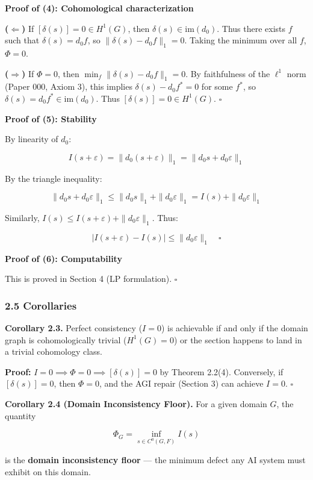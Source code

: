 \documentclass[
]{article}
\begin{document}
\textbf{Proof of (4): Cohomological characterization}

\textbf{(\(\Longleftarrow\))} If \([\delta(s)] = 0 \in H^1(G)\), then
\(\delta(s) \in \text{im}(d_0)\). Thus there exists \(f\) such that
\(\delta(s) = d_0 f\), so \(\|\delta(s) - d_0 f\|_1 = 0\). Taking the
minimum over all \(f\), \(\Phi = 0\).

\textbf{(\(\Longrightarrow\))} If \(\Phi = 0\), then
\(\min_f \|\delta(s) - d_0 f\|_1 = 0\). By faithfulness of the
\(\ell^1\) norm (Paper 000, Axiom 3), this implies
\(\delta(s) - d_0 f^* = 0\) for some \(f^*\), so
\(\delta(s) = d_0 f^* \in \text{im}(d_0)\). Thus
\([\delta(s)] = 0 \in H^1(G)\). \(\square\)

\textbf{Proof of (5): Stability}

By linearity of \(d_0\):

\[I(s + \varepsilon) = \|d_0(s + \varepsilon)\|_1 = \|d_0 s + d_0 \varepsilon\|_1\]

By the triangle inequality:

\[\|d_0 s + d_0 \varepsilon\|_1 \leq \|d_0 s\|_1 + \|d_0 \varepsilon\|_1 = I(s) + \|d_0 \varepsilon\|_1\]

Similarly, \(I(s) \leq I(s + \varepsilon) + \|d_0 \varepsilon\|_1\).
Thus:

\[|I(s + \varepsilon) - I(s)| \leq \|d_0 \varepsilon\|_1 \quad \square\]

\textbf{Proof of (6): Computability}

This is proved in Section 4 (LP formulation). \(\square\)

\subsubsection{2.5 Corollaries}\label{corollaries}

\textbf{Corollary 2.3.} Perfect consistency (\(I = 0\)) is achievable if
and only if the domain graph is cohomologically trivial (\(H^1(G) = 0\))
or the section happens to land in a trivial cohomology class.

\textbf{Proof:} \(I = 0 \implies \Phi = 0 \implies [\delta(s)] = 0\) by
Theorem 2.2(4). Conversely, if \([\delta(s)] = 0\), then \(\Phi = 0\),
and the AGI repair (Section 3) can achieve \(I = 0\). \(\square\)

\textbf{Corollary 2.4 (Domain Inconsistency Floor).} For a given domain
\(G\), the quantity

\[\Phi_G = \inf_{s \in C^0(G, F)} I(s)\]

is the \textbf{domain inconsistency floor} --- the minimum defect any AI
system must exhibit on this domain.
\end{document}
